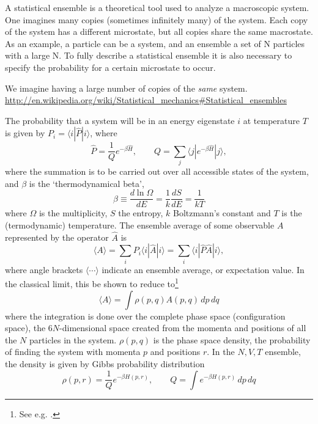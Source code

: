 \documentclass[11pt]{scrbook}   %
\begin{document}
A statistical ensemble is a theoretical tool used to analyze a macroscopic system. One imagines many copies (sometimes infinitely many) of the system. Each copy of the system has a different microstate, but all copies share the same macrostate. As an example, a particle can be a system, and an ensemble a set of N particles with a large N.
To fully describe a statistical ensemble it is also necessary to specify the probability for a certain microstate to occur.


We imagine having a large number of copies of the \emph{same} system. 
\url{http://en.wikipedia.org/wiki/Statistical_mechanics#Statistical_ensembles}


The probability that a system will be in an energy eigenstate $i$ at temperature $T$ is 
given by $P_i=\langle i | \hat{P} | i \rangle$, where
\begin{equation}
  \hat{P} = \frac{1}{Q} e^{-\beta\hat{H}}, \qquad Q = \sum_j \langle j | e^{-\beta\hat{H}} | j \rangle,
\end{equation}
where the summation is to be carried out over all accessible states of the system, and
$\beta$ is the `thermodynamical beta',
\begin{equation}
  \beta \equiv \frac{d\ln\Omega}{dE} = \frac{1}{k}\frac{dS}{dE} = \frac{1}{kT}
\end{equation}
where $\Omega$ is the multiplicity, $S$ the entropy, $k$ Boltzmann's constant and $T$ is the (termodynamic) temperature. 
The ensemble average of some observable $A$ represented by the operator $\hat{A}$ is
\begin{equation}
  \langle A \rangle = \sum_i P_i \langle i | \hat{A} | i\rangle = \sum_i \langle i | \hat{P} \hat{A} | i \rangle,
\end{equation}
where angle brackets $\langle \cdots \rangle$ indicate an ensemble average, or expectation value.
In the classical limit, this be shown to reduce to\footnote{See e.g. \cite[13-15]{Frenkel:1996}.}
\begin{equation}
  \langle A \rangle = \int \rho(p,q) A(p,q)\,dp\,dq 
  \label{eq:configuration-int}
\end{equation}
where the integration is done over the complete phase space (configuration space), the $6N$-dimensional space created from the momenta and positions of all the $N$ particles in the system. $\rho(p,q)$ is the phase space density, the probability of finding the system with momenta $p$ and positions $r$. In the $N,V,T$ ensemble, the density is given by Gibbs probability distribution
\begin{equation}
  \rho(p,r) = \frac{1}{Q} e^{-\beta H(p,r)},\qquad Q = \int e^{-\beta H(p,r)} \,dp\,dq
\end{equation}
\end{document}
